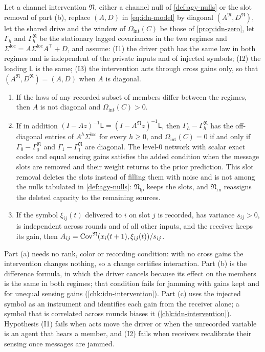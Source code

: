 \begin{theorem}\label{thm:idn-intervention}
Let a channel intervention $\mathfrak N$, either a channel null of \cref{def:agy-nulls} or the slot removal of part (b), replace $(A,D)$ in \cref{eq:idn-model} by diagonal $(A^{\mathfrak N},D^{\mathfrak N})$, let the shared drive and the window of $\Omega_{\mathrm{int}}(C)$ be those of \cref{prop:idn-zero}, let $\Gamma_h$ and $\Gamma_h^{\mathfrak N}$ be the stationary lagged covariances in the two regimes and $\Sigma^{\mathrm{loc}}=A\Sigma^{\mathrm{loc}}A^{\top}+D$, and assume: (I1) the driver path has the same law in both regimes and is independent of the private inputs and of injected symbols; (I2) the loading $\mathsf L$ is the same; (I3) the intervention acts through cross gains only, so that $(A^{\mathfrak N},D^{\mathfrak N})=(A,D)$ when $A$ is diagonal.
\begin{enumerate}
\item[(a)] If the laws of any recorded subset of members differ between the regimes, then $A$ is not diagonal and $\Omega_{\mathrm{int}}(C)>0$.
\item[(b)] If in addition $(I-Az)^{-1}\mathsf L=(I-A^{\mathfrak N}z)^{-1}\mathsf L$, then $\Gamma_h-\Gamma_h^{\mathfrak N}$ has the off-diagonal entries of $A^h\Sigma^{\mathrm{loc}}$ for every $h\ge0$, and $\Omega_{\mathrm{int}}(C)=0$ if and only if $\Gamma_0-\Gamma_0^{\mathfrak N}$ and $\Gamma_1-\Gamma_1^{\mathfrak N}$ are diagonal. The level-0 network with scalar exact codes and equal sensing gains satisfies the added condition when the message slots are removed and their weight returns to the prior prediction. This slot removal deletes the slots instead of filling them with noise and is not among the nulls tabulated in \cref{def:agy-nulls}: $\mathfrak N_{\mathrm{lp}}$ keeps the slots, and $\mathfrak N_{\mathrm{rn}}$ reassigns the deleted capacity to the remaining sources.
\item[(c)] If the symbol $\xi_{ij}(t)$ delivered to $i$ on slot $j$ is recorded, has variance $s_{ij}>0$, is independent across rounds and of all other inputs, and the receiver keeps its gain, then $A_{ij}=\operatorname{Cov}^{\mathfrak N}(x_i(t+1),\xi_{ij}(t))/s_{ij}$.
\end{enumerate}
\end{theorem}

Part (a) needs no rank, color or recording condition: with no cross gains the intervention changes nothing, so a change certifies interaction. Part (b) is the difference formula, in which the driver cancels because its effect on the members is the same in both regimes; that condition fails for jamming with gains kept and for unequal sensing gains (\cref{chk:idn-intervention}). Part (c) uses the injected symbol as an instrument and identifies each gain from the receiver alone; a symbol that is correlated across rounds biases it (\cref{chk:idn-intervention}). Hypothesis (I1) fails when acts move the driver or when the unrecorded variable is an agent that hears a member, and (I2) fails when receivers recalibrate their sensing once messages are jammed.

